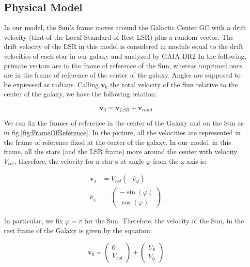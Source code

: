 
\subsection{Physical Model}

In our model, the Sun's frame moves around the Galactic Center GC with a drift velocity (that of the Local Standard of Rest LSR) plus a random vector. The drift velocity of the LSR in this model is considered in module equal to the drift velocities of each star in our galaxy and analyzed by GAIA DR2
In the following, primate vectors are in the frame of reference of the Sun, whereas unprimed ones are in the frame of reference of the center of the galaxy. Angles are supposed to be expressed as radians. 
Calling $\bm{v}_0$ the total velocity of the Sun relative to the center of the galaxy, we have the following relation:

\begin{equation}\label{eq:SunVelocity}
    \bm{v}_0 = \bm{v}_{LSR} + \bm{v}_{rand}
\end{equation}

\noindent
We can fix the frames of reference in the center of the Galaxy and on the Sun as in fig.\ref{fig:FrameOfReference}. In the picture, all the velocities are represented in the frame of reference fixed at the center of the galaxy. In our model, in this frame, all the stars (and the LSR frame) move around the center with velocity $V_{rot}$, therefore, the velocity for a star s at angle $\varphi$ from the x-axis is:

\begin{equation}\label{eq:VComponents}
    \begin{aligned}
        \bm{v}_s &= V_{rot} (-\hat{e}_{\varphi}) \\
        \hat{e}_{\varphi} &= \begin{pmatrix} -\sin(\varphi) \\ \cos(\varphi) \end{pmatrix}
    \end{aligned}
\end{equation}

\noindent
In particular, we fix $\varphi = \pi$ for the Sun. Therefore, the velocity of the Sun, in the rest frame of the Galaxy is given by the equation:

\begin{equation}\label{eq:VSun}
    \bm{v}_0 = \begin{pmatrix} 0 \\ V_{rot} \end{pmatrix} + \begin{pmatrix} U_0 \\ V_0 \end{pmatrix}
\end{equation}
 
